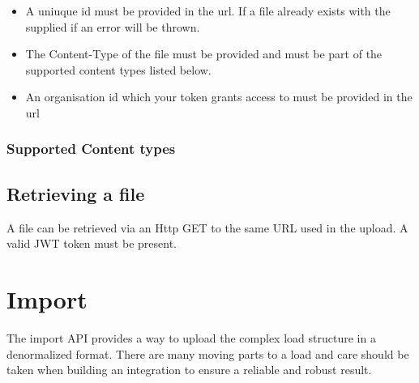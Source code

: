 \documentclass[letterpaper,10pt,english]{sphinxmanual}
\begin{document}
\begin{itemize}
\item {} 
A uniuque id must be provided in the url. If a file already exists with the supplied if an error will be thrown.

\item {} 
The Content-Type of the file must be provided and must be part of the supported content types listed below.

\item {} 
An organisation id which your token grants access to must be provided in the url

\end{itemize}


\subsubsection{Supported Content types}
\label{\detokenize{blob-storage/blob-storage:supported-content-types}}
\begin{sphinxVerbatim}[commandchars=\\\{\}]
\end{sphinxVerbatim}


\subsection{Retrieving a file}
\label{\detokenize{blob-storage/blob-storage:retrieving-a-file}}
A file can be retrieved via an Http GET to the same URL used in the upload. A valid JWT token must be present.



\section{Import}
\label{\detokenize{loads/integration/import:import}}\label{\detokenize{loads/integration/import::doc}}
The import API provides a way to upload the complex load structure in a denormalized format. There are many moving parts to a load and care should be taken when building an integration to ensure a reliable and robust result.
\end{document}
